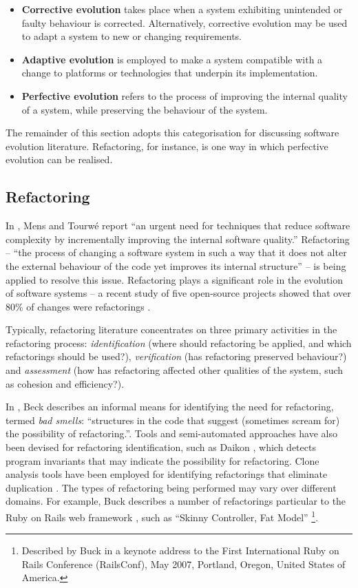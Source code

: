 \begin{itemize}
 \item \textbf{Corrective evolution} takes place when a system exhibiting unintended or faulty behaviour is corrected. Alternatively, corrective evolution may be used to adapt a system to new or changing requirements. 
 \item \textbf{Adaptive evolution} is employed to make a system compatible with a change to platforms or technologies that underpin its implementation.
 \item \textbf{Perfective evolution} refers to the process of improving the internal quality of a system, while preserving the behaviour of the system. 
\end{itemize}

The remainder of this section adopts this categorisation for discussing software evolution literature. Refactoring, for instance, is one way in which perfective evolution can be realised.

\subsection{Refactoring}
\label{subsec:refactoring}
In \cite{mens04survey}, Mens and Tourw\'{e} report ``an urgent need for techniques that reduce software complexity by incrementally improving the internal software quality.'' Refactoring -- ``the process of changing a software system in such a way that it does not alter the external behaviour of the code yet improves its internal structure'' \cite[pg. xvi]{fowler99refactoring} -- is being applied to resolve this issue. Refactoring plays a significant role in the evolution of software systems -- a recent study of five open-source projects showed that over 80\% of changes were refactorings \cite{dig06apis}.

Typically, refactoring literature concentrates on three primary activities in the refactoring process: \emph{identification} (where should refactoring be applied, and which refactorings should be used?), \emph{verification} (has refactoring preserved behaviour?) and \emph{assessment} (how has refactoring affected other qualities of the system, such as cohesion and efficiency?).

In \cite{fowler99refactoring}, Beck describes an informal means for identifying the need for refactoring, termed \textit{bad smells}: ``structures in the code that suggest (sometimes scream for) the possibility of refactoring.''. Tools and semi-automated approaches have also been devised for refactoring identification, such as Daikon \cite{kataoka01automated}, which detects program invariants that may indicate the possibility for refactoring. Clone analysis tools have been employed for identifying refactorings that eliminate duplication \cite{balazinska00advanced,ducasse99language}. The types of refactoring being performed may vary over different domains. For example, Buck describes a number of refactorings particular to the Ruby on Rails web framework \cite{ror}, such as ``Skinny Controller, Fat Model'' \footnote{Described by Buck in a keynote address to the First International Ruby on Rails Conference (RailsConf), May 2007, Portland, Oregon, United States of America.}.


